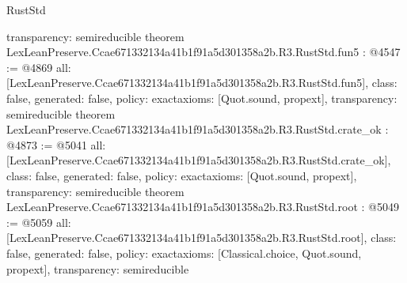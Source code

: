 \begin{lexlean}{RustStd}
\begin{coremodule}
{  transparency: semireducible
}
theorem LexLeanPreserve.Ccae671332134a41b1f91a5d301358a2b.R3.RustStd.fun5 : @4547 := @4869 {
  all: [LexLeanPreserve.Ccae671332134a41b1f91a5d301358a2b.R3.RustStd.fun5],
  class: false,
  generated: false,
  policy: exact{axioms: [Quot.sound, propext]},
  transparency: semireducible
}
theorem LexLeanPreserve.Ccae671332134a41b1f91a5d301358a2b.R3.RustStd.crate_ok : @4873 := @5041 {
  all: [LexLeanPreserve.Ccae671332134a41b1f91a5d301358a2b.R3.RustStd.crate_ok],
  class: false,
  generated: false,
  policy: exact{axioms: [Quot.sound, propext]},
  transparency: semireducible
}
theorem LexLeanPreserve.Ccae671332134a41b1f91a5d301358a2b.R3.RustStd.root : @5049 := @5059 {
  all: [LexLeanPreserve.Ccae671332134a41b1f91a5d301358a2b.R3.RustStd.root],
  class: false,
  generated: false,
  policy: exact{axioms: [Classical.choice, Quot.sound, propext]},
  transparency: semireducible
}


\end{coremodule}
\end{lexlean}

